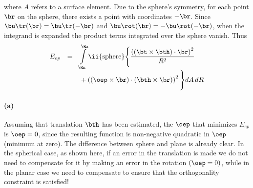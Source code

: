 \documentclass[10pt,twocolumn]{article}
\begin{document}
where $A$ refers to a surface element. Due to the sphere's symmetry,
for each point $\br$ on the sphere, there exists a point with
coordinates $-\br$. Since $\bu\tr (\br) = \bu\tr (-\br)$ and $\bu\rot
(\br) = -\bu\rot (-\br)$, when the integrand is expanded the product
terms integrated over the sphere vanish. Thus
\begin{displaymath}
  \begin{array}{rcl}
\displaystyle E_{ep} & = &
\displaystyle \int\limits^{\Rx}_{\Rn}\ii{\rm sphere}
\Bigg\{
  \frac{\left(\left(\bt \times \bth\right) \cdot \br\right)^2}{{R}^2}
\\
& &
  {}+ \left(\left(\oep \times \br\right) \cdot \left(\bth \times
  \br\right)\right)^2\Bigg\} dA\,dR
  \end{array}
\end{displaymath}

\paragraph{(a)}
Assuming that translation $\bth$ has been estimated, the $\oep$ that
minimizes $E_{ep}$ is $\oep = 0$, since the resulting function is
non-negative quadratic in $\oep$ (minimum at zero). The difference
between sphere and plane is already clear. In the spherical case, as
shown here, if an error in the translation is made we do not need to
compensate for it by making an error in the rotation $(\oep = 0)$,
while in the planar case we need to compensate to ensure that the
orthogonality constraint is satisfied!
\end{document}
